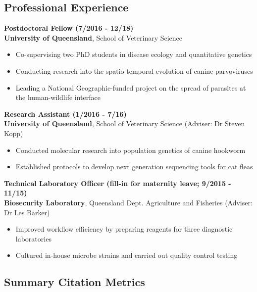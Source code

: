 \documentclass[]{article}
\providecommand{\tightlist}{%
  \setlength{\itemsep}{0pt}\setlength{\parskip}{0pt}}
\begin{document}
\pagebreak

\subsection{Professional Experience}\label{professional-experience}

\textbf{Postdoctoral Fellow (7/2016 - 12/18)}\\
\textbf{University of Queensland}, School of Veterinary Science

\begin{itemize}
\tightlist
\item
  Co-supervising two PhD students in disease ecology and quantitative
  genetics
\item
  Conducting research into the spatio-temporal evolution of canine
  parvoviruses
\item
  Leading a National Geographic-funded project on the spread of
  parasites at the human-wildlife interface
\end{itemize}

\textbf{Research Assistant (1/2016 - 7/16)}\\
\textbf{University of Queensland}, School of Veterinary Science
(Adviser: Dr Steven Kopp)

\begin{itemize}
\tightlist
\item
  Conducted molecular research into population genetics of canine
  hookworm
\item
  Established protocols to develop next generation sequencing tools for
  cat fleas
\end{itemize}

\textbf{Technical Laboratory Officer (fill-in for maternity leave;
9/2015 - 11/15)}\\
\textbf{Biosecurity Laboratory}, Queensland Dept. Agriculture and
Fisheries (Adviser: Dr Les Barker)

\begin{itemize}
\tightlist
\item
  Improved workflow efficiency by preparing reagents for three
  diagnostic laboratories
\item
  Cultured in-house microbe strains and carried out quality control
  testing
\end{itemize}

\subsection{Summary Citation Metrics}\label{summary-citation-metrics}
\end{document}
